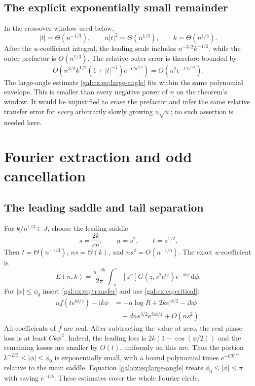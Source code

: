 \documentclass[11pt,letterpaper]{article}
\numberwithin{equation}{section}
\theoremstyle{definition}\newtheorem{definition}[theorem]{Definition}
\theoremstyle{remark}\newtheorem{remark}[theorem]{Remark}
\newcommand{\ii}{\mathrm i}
\newcommand{\dd}{\mathrm d}
\begin{document}
\subsection{The explicit exponentially small remainder}
In the crossover window used below,
\[
|t|=\Theta(n^{-1/3}),\qquad n|t|^2=\Theta(n^{1/3}),
\qquad k=\Theta(n^{1/3}).
\]
After the $u$-coefficient integral, the leading scale includes
$n^{-3/2}k^{-1/2}$, while the outer prefactor is $O(n^{1/3})$.
The relative outer error is therefore bounded by
\begin{equation}\label{gal:cx:eq:outerrelative}
O\!\left(n^{3/2}k^{1/2}(1+|t|^{-1})e^{-C n^{1/3}}\right)
=O(n^2e^{-C n^{1/3}}).
\end{equation}
The large-angle estimate \eqref{gal:cx:eq:large-angle} fits within the same polynomial envelope. This is smaller than every negative power of $n$ on the theorem's window. It would be unjustified to erase the prefactor and infer the same relative transfer error for \emph{every} arbitrarily slowly growing $n\sqrt u$; no such assertion is needed here.

\section{Fourier extraction and odd cancellation}
\subsection{The leading saddle and tail separation}
For $k/n^{1/3}\in J$, choose the leading saddle
\begin{equation}\label{gal:cx:eq:saddle}
s=\frac{2k}{cn},\qquad u=s^2,\qquad t=s^{1/2}.
\end{equation}
Then $t=\Theta(n^{-1/3})$, $ns=\Theta(k)$, and $ns^2=O(n^{-1/3})$.
The exact $u$-coefficient is
\begin{equation}\label{gal:cx:eq:fourier}
E(n,k)=\frac{s^{-2k}}{2\pi}\int_{-\pi}^{\pi}
[z^n]G(z,s^2e^{\ii\phi})e^{-\ii k\phi}\,\dd\phi.
\end{equation}
For $|\phi|\le\phi_0$ insert \eqref{gal:cx:eq:transfer} and use \eqref{gal:cx:eq:critical}:
\begin{equation}\label{gal:cx:eq:phase}
\begin{aligned}
nf(te^{\ii\phi/4})-\ii k\phi
&=-n\log R+2ke^{\ii\phi/2}-\ii k\phi\\
&\quad-dns^{3/2}e^{3\ii\phi/4}+O(ns^2).
\end{aligned}
\end{equation}
All coefficients of $f$ are real. After subtracting the value at zero, the real phase loss is at least $Ck\phi^2$. Indeed, the leading loss is $2k(1-\cos(\phi/2))$ and the remaining losses are smaller by $O(t)$, uniformly on this arc. Thus the portion $k^{-2/5}\le|\phi|\le\phi_0$ is exponentially small, with a bound polynomial times $e^{-Ck^{1/5}}$ relative to the main saddle. Equation \eqref{gal:cx:eq:large-angle} treats $\phi_0\le|\phi|\le\pi$ with saving $e^{-Ck}$. These estimates cover the whole Fourier circle.
\end{document}
